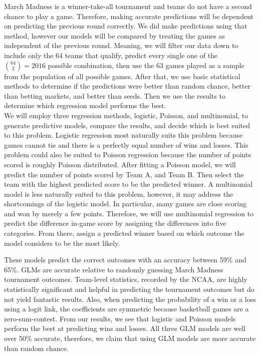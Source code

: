 \documentclass[
  english,
  man,floatsintext]{apa6}
\begin{document}
March Madness is a winner-take-all tournament and teams do not have a second chance to play a game. Therefore, making accurate predictions will be dependent on predicting the previous round correctly. We did make predictions using that method, however our models will be compared by treating the games as independent of the previous round. Meaning, we will filter our data down to include only the 64 teams that qualify, predict every single one of the \({64\choose 2} = 2016\) possible combination, then use the 63 games played as a sample from the population of all possible games. After that, we use basic statistical methods to determine if the predictions were better than random chance, better than betting markets, and better than seeds. Then we use the results to determine which regression model performs the best.\\
We will employ three regression methods, logistic, Poisson, and multinomial, to generate predictive models, compare the results, and decide which is best suited to this problem. Logistic regression most naturally suits this problem because games cannot tie and there is a perfectly equal number of wins and losses. This problem could also be suited to Poisson regression because the number of points scored is roughly Poisson distributed. After fitting a Poisson model, we will predict the number of points scored by Team A, and Team B. Then select the team with the highest predicted score to be the predicted winner. A multinomial model is less naturally suited to this problem, however, it may address the shortcomings of the logistic model. In particular, many games are close scoring and won by merely a few points. Therefore, we will use multinomial regression to predict the difference in-game score by assigning the differences into five categories. From there, assign a predicted winner based on which outcome the model considers to be the most likely.

These models predict the correct outcomes with an accuracy between 59\% and 65\%. GLMs are accurate relative to randomly guessing March Madness tournament outcomes. Team-level statistics, recorded by the NCAA, are highly statistically significant and helpful in predicting the tournament outcomes but do not yield fantastic results. Also, when predicting the probability of a win or a loss using a logit link, the coefficients are symmetric because basketball games are a zero-sum-contest. From our results, we see that logistic and Poisson models perform the best at predicting wins and losses. All three GLM models are well over 50\% accurate, therefore, we claim that using GLM models are more accurate than random chance.
\end{document}
